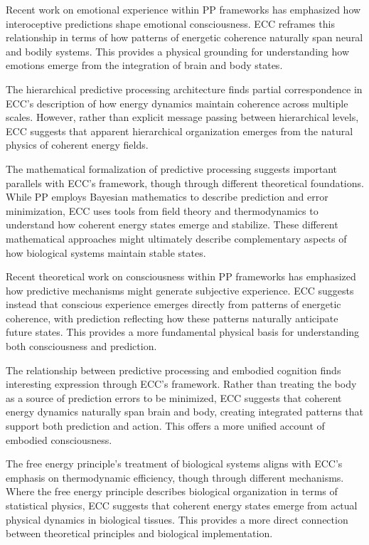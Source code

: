 \begin{refsection}
Recent work on emotional experience within PP frameworks \cite{Seth2012} has emphasized how interoceptive predictions shape emotional consciousness. ECC reframes this relationship in terms of how patterns of energetic coherence naturally span neural and bodily systems. This provides a physical grounding for understanding how emotions emerge from the integration of brain and body states.

The hierarchical predictive processing architecture \cite{Clark2013} finds partial correspondence in ECC's description of how energy dynamics maintain coherence across multiple scales. However, rather than explicit message passing between hierarchical levels, ECC suggests that apparent hierarchical organization emerges from the natural physics of coherent energy fields.

The mathematical formalization of predictive processing \cite{Friston2009} suggests important parallels with ECC's framework, though through different theoretical foundations. While PP employs Bayesian mathematics to describe prediction and error minimization, ECC uses tools from field theory and thermodynamics to understand how coherent energy states emerge and stabilize. These different mathematical approaches might ultimately describe complementary aspects of how biological systems maintain stable states.

Recent theoretical work on consciousness within PP frameworks \cite{Seth2016} has emphasized how predictive mechanisms might generate subjective experience. ECC suggests instead that conscious experience emerges directly from patterns of energetic coherence, with prediction reflecting how these patterns naturally anticipate future states. This provides a more fundamental physical basis for understanding both consciousness and prediction.

The relationship between predictive processing and embodied cognition \cite{Clark2016} finds interesting expression through ECC's framework. Rather than treating the body as a source of prediction errors to be minimized, ECC suggests that coherent energy dynamics naturally span brain and body, creating integrated patterns that support both prediction and action. This offers a more unified account of embodied consciousness.

The free energy principle's treatment of biological systems \cite{Friston2010} aligns with ECC's emphasis on thermodynamic efficiency, though through different mechanisms. Where the free energy principle describes biological organization in terms of statistical physics, ECC suggests that coherent energy states emerge from actual physical dynamics in biological tissues. This provides a more direct connection between theoretical principles and biological implementation.


\end{refsection}
